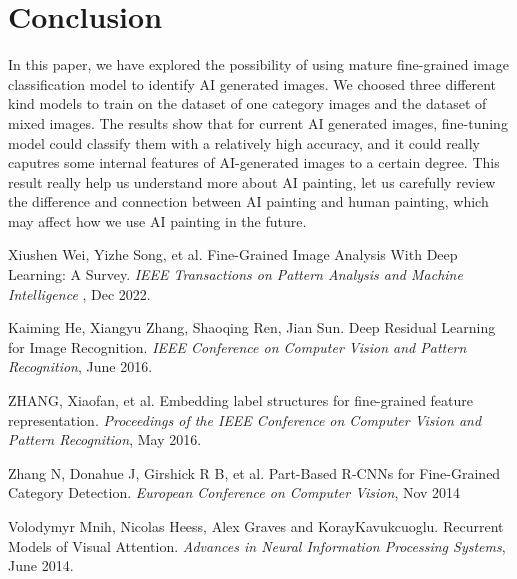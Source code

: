 \documentclass[conference]{IEEEtran}
\begin{document}
\section{Conclusion}

In this paper, we have explored the possibility of using mature fine-grained image classification model to identify AI generated images. We choosed three different kind models to train on the dataset of one category images and the dataset of mixed images. The results show that for current AI generated images, fine-tuning model could classify them with a relatively
high accuracy, and it could really caputres some internal features of AI-generated images to a certain degree. This result really help us understand more about AI painting, let us carefully review the difference and connection between AI painting and human painting, which may affect how we use AI painting in the future. 

\begin{thebibliography}{1}
  Xiushen Wei, Yizhe Song, et al. Fine-Grained Image Analysis With Deep Learning: A Survey. \emph{IEEE Transactions on Pattern Analysis and Machine Intelligence }, Dec 2022.
  
  Kaiming He, Xiangyu Zhang, Shaoqing Ren, Jian Sun. Deep Residual Learning for Image Recognition. \emph{IEEE Conference on Computer Vision and Pattern Recognition}, June 2016.

  ZHANG, Xiaofan, et al. Embedding label structures for fine-grained feature representation. \emph{Proceedings of the IEEE Conference on Computer Vision and Pattern Recognition}, May 2016. 

  Zhang N, Donahue J, Girshick R B, et al. Part-Based R-CNNs for Fine-Grained Category Detection. \emph{European Conference on Computer Vision}, Nov 2014

  Volodymyr Mnih, Nicolas Heess, Alex Graves and KorayKavukcuoglu. Recurrent Models of Visual Attention. \emph{Advances in Neural Information Processing Systems}, June 2014.
\end{thebibliography}
\end{document}
